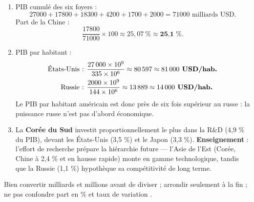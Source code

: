 \documentclass[11pt]{article}
\begin{document}
\begin{corrige}
\begin{enumerate}
\item PIB cumulé des six foyers :
\[ \num{27000} + \num{17800} + \num{18300} + \num{4200} + \num{1700} + \num{2000} = \num{71000} \text{ milliards USD}. \]
Part de la Chine :
\[ \frac{\num{17800}}{\num{71000}} \times 100 \approx 25{,}07\ \% \approx \textbf{25{,}1\ \%}. \]
\item PIB par habitant :
\begin{align*}
\text{États-Unis : } & \frac{\num{27000}\times 10^9}{335\times 10^6} \approx \num{80597} \approx \textbf{\num{81000} USD/hab.} \\
\text{Russie : } & \frac{\num{2000}\times 10^9}{144\times 10^6} \approx \num{13889} \approx \textbf{\num{14000} USD/hab.}
\end{align*}
Le PIB par habitant américain est donc près de six fois supérieur au russe : la puissance russe n'est pas d'abord économique.
\item La \textbf{Corée du Sud} investit proportionnellement le plus dans la R\&D (4,9 \% du PIB), devant les États-Unis (3,5 \%) et le Japon (3,3 \%). \textbf{Enseignement} : l'effort de recherche prépare la hiérarchie future — l'Asie de l'Est (Corée, Chine à 2,4 \% et en hausse rapide) monte en gamme technologique, tandis que la Russie (1,1 \%) hypothèque sa compétitivité de long terme.
\end{enumerate}
\begin{attention}
Bien convertir milliards et millions avant de diviser ; arrondir seulement à la fin ; ne pas confondre \og part en \% \fg{} et \og taux de variation \fg{}.
\end{attention}
\end{corrige}
\end{document}

